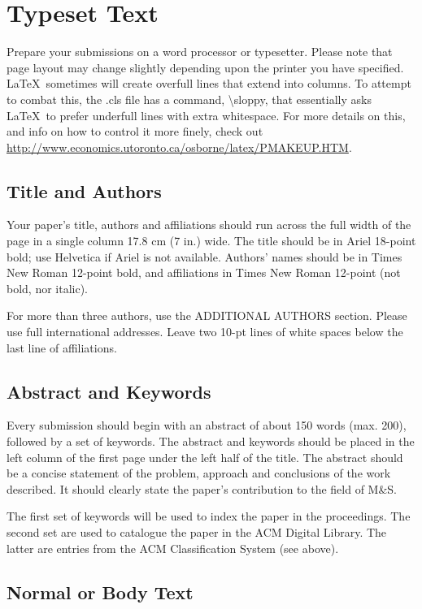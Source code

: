 \documentclass{scsPaperFormattingTemplate-LaTex-Revised20160302}
\begin{document}
\section{Typeset Text}

Prepare your submissions on a word processor or typesetter.  Please
note that page layout may change slightly depending upon the printer
you have specified.  \LaTeX\ sometimes will create overfull lines
that extend into columns.  To attempt to combat this, the .cls
file has a command, {\textbackslash}sloppy, that essentially asks
\LaTeX\ to prefer underfull lines with extra whitespace.  For more
details on this, and info on how to control it more finely, check out
{\url{http://www.economics.utoronto.ca/osborne/latex/PMAKEUP.HTM}}.

\subsection{Title and Authors}

Your paper’s title, authors and affiliations should run across the full width of the page in a single column 17.8 cm (7 in.) wide. The title should be in Ariel 18-point bold; use Helvetica if Ariel is not available. Authors’ names should be in Times New Roman 12-point bold, and affiliations in Times New Roman 12-point (not bold, nor italic). 

For more than three authors, use the ADDITIONAL AUTHORS section. Please use full international addresses. Leave two 10-pt lines of white spaces below the last line of affiliations. 

\subsection{Abstract and Keywords}

Every submission should begin with an abstract of about 150 words (max. 200), followed by a set of keywords. The abstract and keywords should be placed in the left column of the first page under the left half of the title. The abstract should be a concise statement of the problem, approach and conclusions of the work described. It should clearly state the paper's contribution to the field of M\&S.

The first set of keywords will be used to index the paper in the proceedings. The second set are used to catalogue the paper in the ACM Digital Library. The latter are entries from the ACM Classification System (see above).

\subsection{Normal or Body Text}
\end{document}
